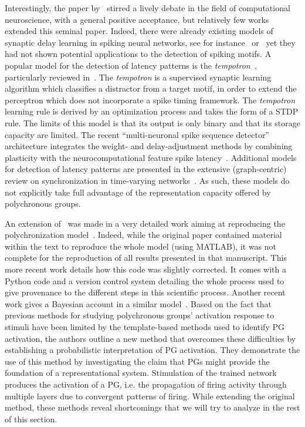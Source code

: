 \documentclass[brainsci, %
               review,submit,pdftex,moreauthors
               ]{Definitions/mdpi}
\begin{document}
Interestingly, the paper by~\citep{izhikevich_polychronization_2006} stirred a lively debate in the field of computational neuroscience, with a general positive acceptance, but relatively few works extended this seminal paper. Indeed, there were already existing models of synaptic delay learning in spiking neural networks, see for instance~\citep{huning_synaptic_1998} or~\citep{eurich_dynamics_1999} yet they had not shown potential applications to the detection of spiking motifs. A popular model for the detection of latency patterns is the \emph{tempotron}~\citep{gutig_tempotron_2006}, particularly reviewed in~\citep{gutig_spike_2014}. The \emph{tempotron} is a supervised synaptic learning algorithm which classifies a distractor from a target motif, in order to extend the perceptron which does not incorporate a spike timing framework. The \emph{tempotron} learning rule is derived by an optimization process and takes the form of a STDP rule. The limits of this model is that its output is only binary and that its storage capacity are limited. The recent ``multi-neuronal spike sequence detector'' architecture integrates the weight- and delay-adjustment methods by combining plasticity with the neurocomputational feature spike latency~\citep{susi_nmnsd-spiking_2021}. Additional models for detection of latency patterns are presented in the extensive (graph-centric) review on synchronization in time-varying networks~\citep{ghosh_synchronization_2021,ghosh_synchronized_2022}. As such, these models do not explicitly take full advantage of the representation capacity offered by polychronous groups. 

An extension of~\citep{izhikevich_polychronization_2006} was made in a very detailed work aiming at reproducing the polychronization model~\citep{pauli_reproducing_2018}. Indeed, while the original paper contained material within the text to reproduce the whole model (using MATLAB), it was not complete for the reproduction of all results presented in that manuscript. This more recent work details how this code was slightly corrected. It comes with a Python code and a version control system detailing the whole process used to give provenance to the different steps in this scientific process. Another recent work gives a Bayesian account in a similar model~\citep{guise_bayesian_2014}. Based on the fact that previous methods for studying polychronous groups' activation response to stimuli have been limited by the template-based methods used to identify PG activation, the authors outline a new method that overcomes these difficulties by establishing a probabilistic interpretation of PG activation. They demonstrate the use of this method by investigating the claim that PGs might provide the foundation of a representational system. Stimulation of the trained network produces the activation of a PG, i.e. the propagation of firing activity through multiple layers due to convergent patterns of firing. While extending the original method, these methods reveal shortcomings that we will try to analyze in the rest of this section.
%
\end{document}
